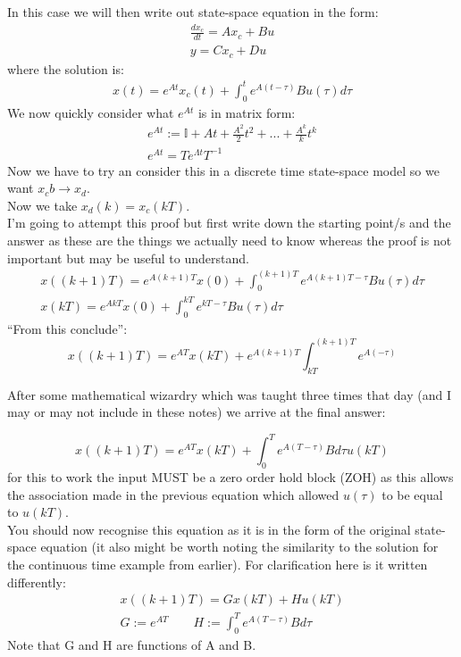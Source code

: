 \documentclass[a4paper,11pt]{article}
\begin{document}
In this case we will then write out state-space equation in the form: 
\begin{gather}
	\frac{dx_c}{dt}= Ax_c+Bu\\
	y = Cx_c + Du
\end{gather}   
where the solution is:
\begin{gather}
	x(t) =e^{At}x_c(t)+ \int_{0}^t e^{A(t-\tau)}Bu(\tau)d\tau
\end{gather}                                               
We now quickly consider what $e^{At}$ is in matrix form:
\begin{gather}
	e^{At}:=\mathbb{I}+At + \frac{A^2}{2}t^2+...+\frac{A^k}{k}t^{k}\\
	e^{At} = Te^{\Lambda t}T^{-1}
\end{gather}                                                                         
Now we have to try an consider this in a discrete time state-space model so we want $x_cb \rightarrow x_d$.\\
Now we take $x_d(k)=x_c(kT)$.\\
I'm going to attempt this proof but first write down the starting point/s and the answer as these are the things we actually need to know whereas the proof is not important but may be useful to understand.\\
\begin{gather}
	x((k+1)T)= e^{A(k+1)T}x(0) + \int_0^{(k+1)T}e^{A(k+1)T-\tau}Bu(\tau)d\tau	\\
	x(kT)= e^{AkT}x(0) + \int_0^{kT}e^{kT-\tau}Bu(\tau)d\tau	
\end{gather}
``From this conclude'':
\begin{equation}
	x((k+1)T)= e^{AT}x(kT)+ e^{A(k+1)T}\int^{(k+1)T}_{kT}e^{A(-\tau)}
\end{equation}

After some mathematical wizardry which was taught three times that day (and I may or may not include in these notes) we arrive at the final answer:

\begin{equation}
	x((k+1)T)=e^{AT}x(kT)+\int^{T}_{0}e^{A(T-\tau)}Bd\tau u(kT)
\end{equation}
for this to work the input MUST be a zero order hold block (ZOH) as this allows the association made in the previous equation which allowed $u(\tau)$ to be equal to $u(kT)$.\\ 
You should now recognise this equation as it is in the form of the original state-space equation (it also might be worth noting the similarity to the solution for the continuous time example from earlier). For clarification here is it written differently:
\begin{gather}
	x((k+1)T) = G x(kT) + H u(kT)\\
	G:=e^{AT} \qquad H:=\int^{T}_{0} e^{A(T-\tau)}Bd\tau
\end{gather}
Note that G and H are functions of A and B.
\end{document}

